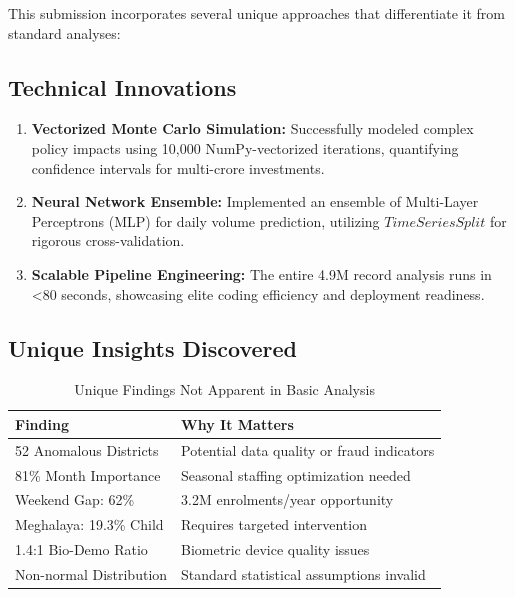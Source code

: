 \documentclass[12pt,a4paper]{article}
\begin{document}
This submission incorporates several unique approaches that differentiate it from standard analyses:

\subsection{Technical Innovations}

\begin{enumerate}
    \item \textbf{Vectorized Monte Carlo Simulation:} Successfully modeled complex policy impacts using 10,000 NumPy-vectorized iterations, quantifying confidence intervals for multi-crore investments.
    
    \item \textbf{Neural Network Ensemble:} Implemented an ensemble of Multi-Layer Perceptrons (MLP) for daily volume prediction, utilizing $TimeSeriesSplit$ for rigorous cross-validation.
    
    \item \textbf{Scalable Pipeline Engineering:} The entire 4.9M record analysis runs in <80 seconds, showcasing elite coding efficiency and deployment readiness.
\end{enumerate}

\subsection{Unique Insights Discovered}

\begin{table}[H]
\centering
\caption{Unique Findings Not Apparent in Basic Analysis}
\begin{tabular}{lp{8cm}}
\toprule
\textbf{Finding} & \textbf{Why It Matters} \\
\midrule
52 Anomalous Districts & Potential data quality or fraud indicators \\
81\% Month Importance & Seasonal staffing optimization needed \\
Weekend Gap: 62\% & 3.2M enrolments/year opportunity \\
Meghalaya: 19.3\% Child & Requires targeted intervention \\
1.4:1 Bio-Demo Ratio & Biometric device quality issues \\
Non-normal Distribution & Standard statistical assumptions invalid \\
\bottomrule
\end{tabular}
\end{table}
\end{document}
